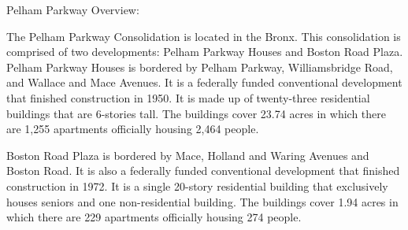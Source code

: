 Pelham Parkway Overview:  



The Pelham Parkway Consolidation is located in the Bronx. This consolidation is comprised of two developments: Pelham Parkway Houses and Boston Road Plaza. Pelham Parkway Houses is bordered by Pelham Parkway, Williamsbridge Road, and Wallace and Mace Avenues. It is a federally funded conventional development that finished construction in 1950. It is made up of twenty-three residential buildings that are 6-stories tall. The buildings cover 23.74 acres in which there are 1,255 apartments officially housing 2,464 people.   

  

Boston Road Plaza is bordered by Mace, Holland and Waring Avenues and Boston Road. It is also a federally funded conventional development that finished construction in 1972. It is a single 20-story residential building that exclusively houses seniors and one non-residential building. The buildings cover 1.94 acres in which there are 229 apartments officially housing 274 people.